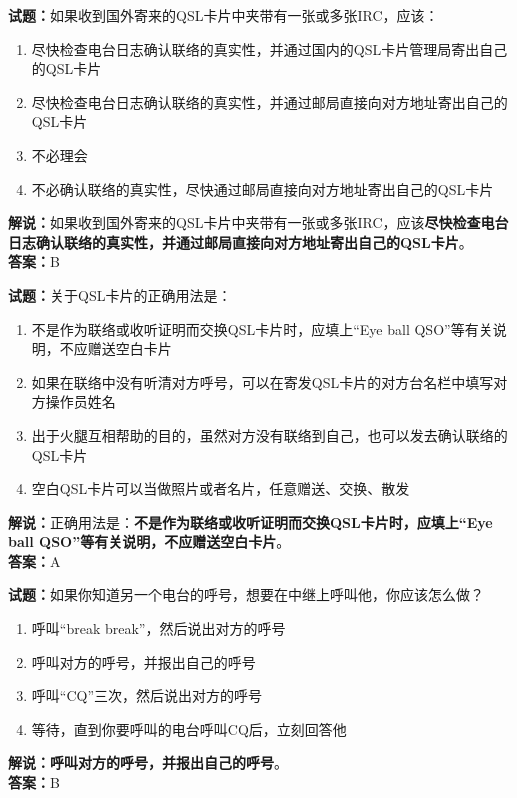 \documentclass{ctexbook}
\begin{document}
\noindent\textbf{试题：}如果收到国外寄来的QSL卡片中夹带有一张或多张IRC，应该：
\begin{enumerate}[leftmargin=3em]
\item 尽快检查电台日志确认联络的真实性，并通过国内的QSL卡片管理局寄出自己的QSL卡片
\item 尽快检查电台日志确认联络的真实性，并通过邮局直接向对方地址寄出自己的QSL卡片
\item 不必理会
\item 不必确认联络的真实性，尽快通过邮局直接向对方地址寄出自己的QSL卡片
\end{enumerate}
\noindent\textbf{解说：}如果收到国外寄来的QSL卡片中夹带有一张或多张IRC，应该\textbf{尽快检查电台日志确认联络的真实性，并通过邮局直接向对方地址寄出自己的QSL卡片}。\\\noindent\textbf{答案：}B




\bigskip


\noindent\textbf{试题：}关于QSL卡片的正确用法是：
\begin{enumerate}[leftmargin=3em]
\item 不是作为联络或收听证明而交换QSL卡片时，应填上“Eye ball QSO”等有关说明，不应赠送空白卡片
\item 如果在联络中没有听清对方呼号，可以在寄发QSL卡片的对方台名栏中填写对方操作员姓名
\item 出于火腿互相帮助的目的，虽然对方没有联络到自己，也可以发去确认联络的QSL卡片
\item 空白QSL卡片可以当做照片或者名片，任意赠送、交换、散发
\end{enumerate}
\noindent\textbf{解说：}正确用法是：\textbf{不是作为联络或收听证明而交换QSL卡片时，应填上“Eye ball QSO”等有关说明，不应赠送空白卡片}。\\\noindent\textbf{答案：}A

\bigskip


\noindent\textbf{试题：}如果你知道另一个电台的呼号，想要在中继上呼叫他，你应该怎么做？
\begin{enumerate}[leftmargin=3em]
\item 呼叫“break break”，然后说出对方的呼号
\item 呼叫对方的呼号，并报出自己的呼号
\item 呼叫“CQ”三次，然后说出对方的呼号
\item 等待，直到你要呼叫的电台呼叫CQ后，立刻回答他
\end{enumerate}
\noindent\textbf{解说：}\textbf{呼叫对方的呼号，并报出自己的呼号}。\\\noindent\textbf{答案：}B
\end{document}
